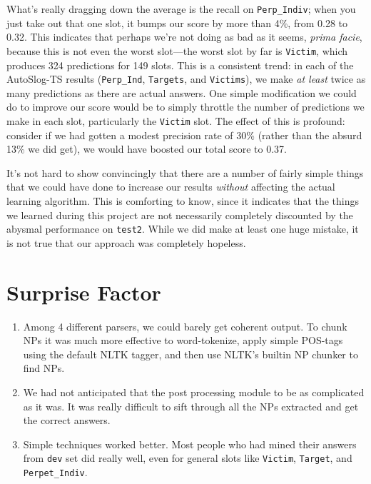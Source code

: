 \documentclass[11pt]{myclass}
\begin{document}
What's really dragging down the average is the recall on \texttt{Perp\_Indiv}; when you just take out that one slot, it bumps our score by more than 4\%, from 0.28 to 0.32. This indicates that perhaps we're not doing as bad as it seems, \textit{prima facie}, because this is not even the worst slot---the worst slot by far is \texttt{Victim}, which produces 324 predictions for 149 slots. This is a consistent trend: in each of the AutoSlog-TS results (\texttt{Perp\_Ind}, \texttt{Targets}, and \texttt{Victims}), we make \textit{at least} twice as many predictions as there are actual answers. One simple modification we could do to improve our score would be to simply throttle the number of predictions we make in each slot, particularly the \texttt{Victim} slot. The effect of this is profound: consider if we had gotten a modest precision rate of 30\% (rather than the absurd 13\% we did get), we would have boosted our total score to 0.37.

It's not hard to show convincingly that there are a number of fairly simple things that we could have done to increase our results \textit{without} affecting the actual learning algorithm. This is comforting to know, since it indicates that the things we learned during this project are not necessarily completely discounted by the abysmal performance on \texttt{test2}. While we did make at least one huge mistake, it is not true that our approach was completely hopeless.




\section{Surprise Factor}

\begin{enumerate}

\item Among 4 different parsers, we could barely get coherent output. To chunk NPs it was much more effective to word-tokenize, apply simple POS-tags using the default NLTK tagger, and then use NLTK's builtin NP chunker to find NPs.

\item We had not anticipated that the post processing module to be as complicated as it was. It was really difficult to sift through all the NPs extracted and get the correct answers.

\item Simple techniques worked better. Most people who had mined their answers from \texttt{dev} set did really well, even for general slots like \texttt{Victim}, \texttt{Target}, and \texttt{Perpet\_Indiv}.

\end{enumerate}
\end{document}
